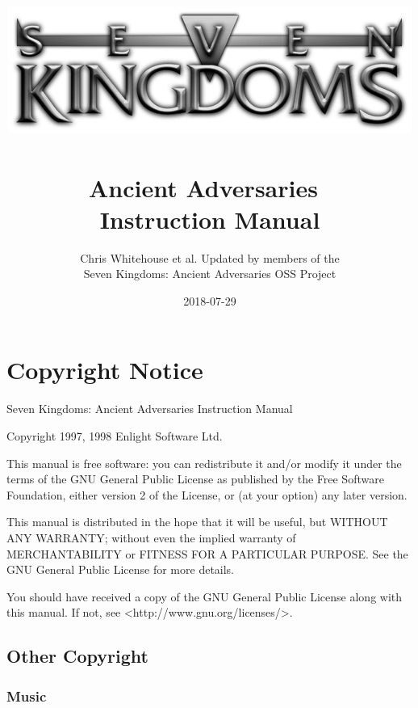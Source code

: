 \documentclass[openany]{book}
\begin{document}
\title{
\includegraphics[width=0.9\linewidth]{7klogo}~\\[1cm]
{\Huge{\textbf{Ancient Adversaries}}}~\\[1cm]
{\huge{\textbf{Instruction Manual}}}
}
\author{Chris Whitehouse et al. Updated by members of the \\
Seven Kingdoms: Ancient Adversaries OSS Project} %
\date{2018-07-29} %

\frontmatter
\maketitle

\section*{Copyright Notice}

Seven Kingdoms: Ancient Adversaries Instruction Manual

Copyright 1997, 1998 Enlight Software Ltd.

This manual is free software: you can redistribute it and/or modify it under the terms of the GNU General Public License as published by the Free Software Foundation, either version 2 of the License, or (at your option) any later version.

This manual is distributed in the hope that it will be useful, but WITHOUT ANY WARRANTY; without even the implied warranty of MERCHANTABILITY or FITNESS FOR A PARTICULAR PURPOSE.  See the GNU General Public License for more details.

You should have received a copy of the GNU General Public License along with this manual.  If not, see <http://www.gnu.org/licenses/>.

\subsection*{Other Copyright}

\subsubsection*{Music}
\end{document}
